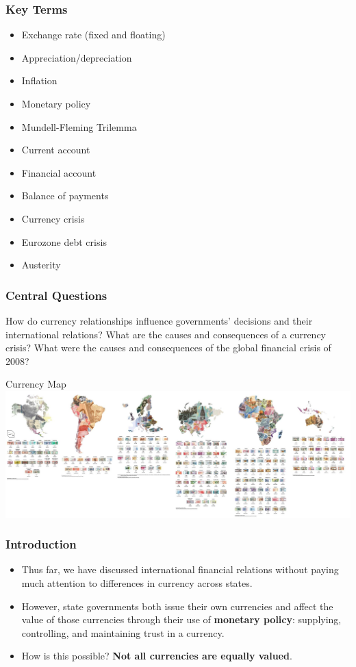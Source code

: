\documentclass[handout]{beamer}
\begin{document}
\begin{frame} 
	\frametitle{\LARGE{Key Terms}}
	\begin{itemize}
		\item Exchange rate (fixed and floating)
		\item Appreciation/depreciation
		\item Inflation
		\item Monetary policy
		\item Mundell-Fleming Trilemma
		\item Current account
		\item Financial account
		\item Balance of payments
		\item Currency crisis
		\item Eurozone debt crisis
		\item Austerity
	\end{itemize}
\end{frame}


\begin{frame} 
\frametitle{\LARGE{Central Questions}}
\centering
\Large{How do currency relationships influence governments' decisions and their international relations? What are the causes and consequences of a currency crisis? What were the causes and consequences of the global financial crisis of 2008?}
\end{frame}

\begin{frame}{\LARGE Currency Map}
    \centering
\includegraphics[width=\textwidth,height=0.8\textheight,keepaspectratio]{currency map.JPG}
\end{frame}

\begin{frame} 
	\frametitle{\LARGE{Introduction}}
	\begin{itemize}
			\item Thus far, we have discussed international financial relations without paying much attention to differences in currency across states. \pause
			\item However, state governments both issue their own currencies and affect the value of those currencies through their use of \textbf{monetary policy}:  supplying, controlling, and maintaining trust in a currency. \pause
			\item How is this possible? \textbf{Not all currencies are equally valued}.				
	\end{itemize}
\end{frame}
\end{document}
